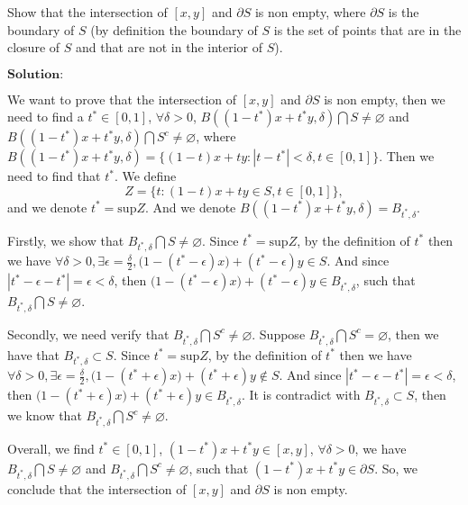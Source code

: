\documentclass[12pt]{article}
\begin{document}
Show that the intersection of $[x, y]$ and $\partial S$ is non empty, where $\partial S$ is the boundary of $S$ (by definition the boundary of $S$ is the set of points that are in the closure of $S$ and that are not in the interior of $S$).

\vspace{8pt}
$\textbf{Solution:}$

We want to prove that the intersection of $[x, y]$ and $\partial S$ is non empty, then we need to find a $t^{*} \in [0, 1]$, $\forall \delta >0$, $B((1-t^{*})x + t^{*}y, \delta) \bigcap S \neq \varnothing$ and $B((1-t^{*})x + t^{*}y, \delta) \bigcap S^{c} \neq \varnothing$, where $B((1-t^{*})x + t^{*}y, \delta) = \{(1-t)x + t y: |t - t^{*} | < \delta, t \in [0, 1] \}.$ Then we need to find that $t^{*}$. We define
\begin{equation*}
    Z = \{t: (1-t) x + t y \in S, t \in [0,1]\},
\end{equation*}
and we denote $t^{*} = \text{sup} {Z}$. And we denote $B((1-t^{*})x + t^{*}y, \delta) = B_{t^{*}, \delta}$. 

Firstly, we show that $B_{t^{*}, \delta} \bigcap S \neq \varnothing$. Since $t^{*} = \text{sup} Z$, by the definition of $t^{*}$ then we have $\forall \delta > 0, \exists \epsilon = \frac{\delta}{2}, \big(1 - (t^{*} - \epsilon)x \big) + (t^{*} - \epsilon) y \in S$. And since $|t^{*} - \epsilon - t^{*}| = \epsilon < \delta$, then $\big(1 - (t^{*} - \epsilon)x \big) + (t^{*} - \epsilon) y \in B_{t^{*}, \delta}$, such that $B_{t^{*}, \delta} \bigcap S \neq \varnothing$.

Secondly, we need verify that $B_{t^{*}, \delta} \bigcap S^{c} \neq \varnothing$. Suppose $B_{t^{*}, \delta} \bigcap S^{c} = \varnothing$, then we have that $B_{t^{*}, \delta} \subset S$. Since $t^{*} = \text{sup} Z$, by the definition of $t^{*}$ then we have $\forall \delta > 0, \exists \epsilon = \frac{\delta}{2}, \big(1 - (t^{*} + \epsilon)x \big) + (t^{*} + \epsilon) y \notin S$. And since $|t^{*} - \epsilon - t^{*}| = \epsilon < \delta$, then $\big(1 - (t^{*} + \epsilon)x \big) + (t^{*} + \epsilon) y \in B_{t^{*}, \delta}$. It is contradict with $B_{t^{*}, \delta} \subset S$, then we know that $B_{t^{*}, \delta} \bigcap S^{c} \neq \varnothing$.

Overall, we find $t^{*} \in [0, 1]$, $(1- t^{*})x + t^{*} y \in [x, y]$, $\forall \delta > 0$, we have $B_{t^{*}, \delta} \bigcap S \neq \varnothing$ and $B_{t^{*}, \delta} \bigcap S^{c} \neq \varnothing$, such that $(1- t^{*})x + t^{*} y \in \partial{S}$. So, we conclude that the intersection of $[x, y]$ and $\partial S$ is non empty.
\end{document}
